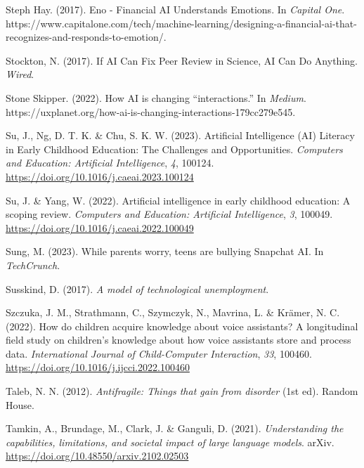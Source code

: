 \documentclass[
  letterpaper,
  DIV=11,
  numbers=noendperiod]{scrartcl}
\newlength{\cslhangindent}
\newenvironment{CSLReferences}[2] %
 {\begin{list}{}{%
  \setlength{\itemindent}{0pt}
  \setlength{\leftmargin}{0pt}
  \setlength{\parsep}{0pt}
  \ifodd #1
   \setlength{\leftmargin}{\cslhangindent}
   \setlength{\itemindent}{-1\cslhangindent}
  \fi
  \setlength{\itemsep}{#2\baselineskip}}}
 {\end{list}}
\begin{document}
\begin{CSLReferences}{1}{0}
Steph Hay. (2017). Eno - {Financial AI Understands Emotions}. In
\emph{Capital One}.
https://www.capitalone.com/tech/machine-learning/designing-a-financial-ai-that-recognizes-and-responds-to-emotion/.

Stockton, N. (2017). If {AI Can Fix Peer Review} in {Science}, {AI Can
Do Anything}. \emph{Wired}.

Stone Skipper. (2022). How {AI} is changing {``interactions.''} In
\emph{Medium}.
https://uxplanet.org/how-ai-is-changing-interactions-179cc279e545.

Su, J., Ng, D. T. K. \& Chu, S. K. W. (2023). Artificial {Intelligence}
({AI}) {Literacy} in {Early Childhood Education}: {The Challenges} and
{Opportunities}. \emph{Computers and Education: Artificial
Intelligence}, \emph{4}, 100124.
\url{https://doi.org/10.1016/j.caeai.2023.100124}

Su, J. \& Yang, W. (2022). Artificial intelligence in early childhood
education: {A} scoping review. \emph{Computers and Education: Artificial
Intelligence}, \emph{3}, 100049.
\url{https://doi.org/10.1016/j.caeai.2022.100049}

Sung, M. (2023). While parents worry, teens are bullying {Snapchat AI}.
In \emph{TechCrunch}.

Susskind, D. (2017). \emph{A model of technological unemployment}.

Szczuka, J. M., Strathmann, C., Szymczyk, N., Mavrina, L. \& Krämer, N.
C. (2022). How do children acquire knowledge about voice assistants? {A}
longitudinal field study on children's knowledge about how voice
assistants store and process data. \emph{International Journal of
Child-Computer Interaction}, \emph{33}, 100460.
\url{https://doi.org/10.1016/j.ijcci.2022.100460}

Taleb, N. N. (2012). \emph{Antifragile: Things that gain from disorder}
(1st ed). Random House.

Tamkin, A., Brundage, M., Clark, J. \& Ganguli, D. (2021).
\emph{Understanding the capabilities, limitations, and societal impact
of large language models}. arXiv.
\url{https://doi.org/10.48550/arxiv.2102.02503}


\end{CSLReferences}
\end{document}
